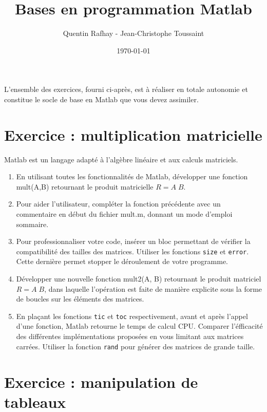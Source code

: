 \documentclass[a4paper, 12pt]{article}
\begin{document}


\title{Bases en programmation Matlab}

\author{Quentin Rafhay - Jean-Christophe Toussaint\\
}
\date{\today}
 
\maketitle


L'ensemble des exercices, fourni ci-après, est à réaliser en totale autonomie et constitue le socle
de base en Matlab que vous devez assimiler.

\section{Exercice : multiplication matricielle}

Matlab est un langage adapté à l'algèbre linéaire et aux calculs matriciels.

\begin{enumerate} 
 \item En utilisant toutes les fonctionnalités de Matlab, développer une fonction mult(A,B)
retournant le produit matricielle $R=A\;B$. 
\item Pour aider l'utilisateur, compléter la fonction précédente avec un commentaire
en début du fichier mult.m, donnant un mode d'emploi sommaire.
\item Pour professionnaliser votre code, insérer un bloc permettant de vérifier la compatibilité
des tailles des matrices. Utiliser les fonctions {\tt size} et {\tt error}. Cette dernière permet stopper 
le déroulement de votre programme.
\item Développer une nouvelle fonction  mult2(A, B) retournant le produit matriciel $R=A\;B$, dans laquelle
l'opération est faite de manière explicite sous la forme de boucles sur les éléments des matrices.
\item En plaçant les fonctions {\tt tic} et {\tt toc} respectivement, avant et après l'appel d'une fonction, Matlab
retourne le temps de calcul CPU. Comparer l'éfficacité des différentes implémentations proposées
en vous limitant aux matrices carrées.
Utiliser la fonction {\tt rand} pour générer des matrices de grande taille. 
\end{enumerate} 

\section{Exercice : manipulation de tableaux}
\end{document}
